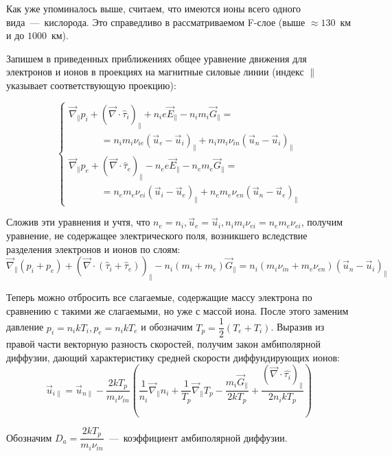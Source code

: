 \documentclass[14pt, a4paper, fleqn]{extarticle}
\begin{document}
Как уже упоминалось выше, считаем, что имеются ионы всего одного вида~---~кислорода. Это справедливо в рассматриваемом F-слое (выше $\approx 130$~км и до $1000$~км).

Запишем в приведенных приближениях общее уравнение движения для электронов и ионов в проекциях на магнитные силовые линии (индекс $\parallel$ указывает соответствующую проекцию):

$$\begin{cases}
\vec{\nabla}_\parallel p_i + (\vec{\nabla}\cdot \hat{\tau}_i)_\parallel + n_ie\vec{E}_\parallel-n_im_i\vec{G}_\parallel=\\
\textrm{ }\textrm{ }\textrm{ }\textrm{ }\textrm{ }=n_im_i\nu_{ie}(\vec{u}_e-\vec{u}_i)_\parallel+n_im_i\nu_{in}(\vec{u}_n-\vec{u}_i)_\parallel\\
\vec{\nabla}_\parallel p_e + (\vec{\nabla}\cdot \hat{\tau}_e)_\parallel - n_ee\vec{E}_\parallel-n_em_e\vec{G}_\parallel=\\
\textrm{ }\textrm{ }\textrm{ }\textrm{ }\textrm{ }=n_em_e\nu_{ei}(\vec{u}_i-\vec{u}_e)_\parallel+n_em_e\nu_{en}(\vec{u}_n-\vec{u}_e)_\parallel
\end{cases}$$

Сложив эти уравнения и учтя, что $n_e=n_i, \vec{u}_e=\vec{u}_i, n_im_i\nu_{ei}=n_em_e\nu_{ei}$, получим уравнение, не содержащее электрического поля, возникшего вследствие разделения электронов и ионов по слоям:
$$\vec{\nabla}_\parallel (p_i+p_e) + (\vec{\nabla}\cdot (\hat{\tau}_i+\hat{\tau}_e))_\parallel-n_i(m_i+m_e)\vec{G}_\parallel=n_i(m_i\nu_{in}+m_e\nu_{en})(\vec{u}_n-\vec{u}_i)_\parallel$$

Теперь можно отбросить все слагаемые, содержащие массу электрона по сравнению с такими же слагаемыми, но уже с массой иона. После этого заменим давление $p_i=n_ikT_i, p_e=n_ikT_e$ и обозначим $T_p=\dfrac{1}{2}(T_e+T_i)$. Выразив из правой части векторную разность скоростей, получим закон амбиполярной диффузии, дающий характеристику средней скорости диффундирующих ионов: 
$$\vec{u}_{i\parallel} = \vec{u}_{n\parallel} - \dfrac{2kT_p}{m_i\nu_{in}}\left(\dfrac{1}{n_i}\vec{\nabla}_\parallel n_i+\dfrac{1}{T_p}\vec{\nabla}_\parallel T_p-\dfrac{m_i\vec{G}_\parallel}{2kT_p}+\dfrac{(\vec{\nabla}\cdot\hat{\tau_i})_\parallel}{2n_ikT_p}\right)$$

Обозначим $D_a=\dfrac{2kT_p}{m_i\nu_{in}}$~---~коэффициент амбиполярной диффузии.
\end{document}
